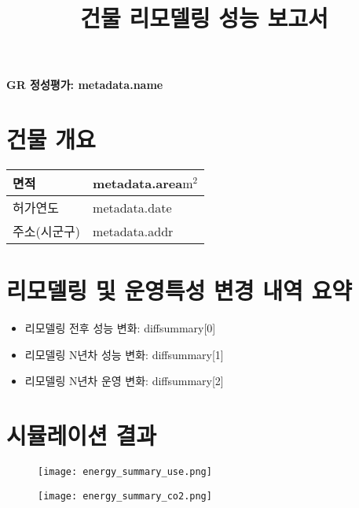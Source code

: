 \documentclass[a4paper,10pt]{article}
\title{건물 리모델링 성능 보고서}
\begin{document}
\begin{center}
    \Large\bfseries GR 정성평가: {{metadata.name}}
\end{center}


\section{건물 개요}


\setlength{\tabcolsep}{0pt}
\renewcommand{\arraystretch}{1.3}

\begin{table}[h!]
\centering
\begin{tabular}{L|C}
\hline
면적 & {{metadata.area}}$\mathrm{m^2}$ \\ \hline
허가연도 & {{metadata.date}} \\ \hline
주소(시군구) & {{metadata.addr}} \\ \hline
\end{tabular}
\end{table}

\section{리모델링 및 운영특성 변경 내역 요약}
\begin{itemize}
    \item 리모델링 전후 성능 변화: {{diffsummary[0]}}
    \item 리모델링 N년차 성능 변화: {{diffsummary[1]}}
    \item 리모델링 N년차 운영 변화: {{diffsummary[2]}}
\end{itemize}

\section{시뮬레이션 결과}
\begin{figure}[h!]
    \centering
    \begin{minipage}[b]{0.49\textwidth}
        \texttt{[image: energy\_summary\_use.png]}
    \end{minipage}
    \hfill
    \begin{minipage}[b]{0.49\textwidth}
        \texttt{[image: energy\_summary\_co2.png]}
    \end{minipage}
\end{figure}
\end{document}
